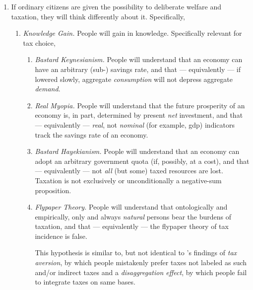 \begin{enumerate}
    \item \label{itm:think-different}
	If ordinary citizens are given the possibility to deliberate welfare and taxation, they will think differently about it.
	Specifically,

	\begin{enumerate}
		\item \label{itm:knowledge-gain} \emph{Knowledge Gain.}
		People will gain in knowledge.
		Specifically relevant for tax choice,

		\begin{enumerate}
			\item \label{itm:bastard-keynesianism} \emph{Bastard Keynesianism.}
			People will understand that an economy can have an arbitrary (sub-\citeauthor{Solow1956}) savings rate, and that --- equivalently --- if lowered slowly, aggregate \emph{consumption} will not depress aggregate \emph{demand}.

			\item \label{itm:real-myopia} \emph{Real Myopia.}
			People will understand that the future prosperity of an economy is, in part, determined by present \emph{net} investment, and that --- equivalently --- \emph{real}, not \emph{nominal} (for example, \gls{gdp}) indicators track the savings rate of an economy.

			\item \label{itm:bastard-hayekianism} \emph{Bastard Hayekianism.}
			People will understand that an economy can adopt an arbitrary government quota (if, possibly, at a cost), and that --- equivalently --- not \emph{all} (but some) taxed resources are lost.
			Taxation is not exclusively or unconditionally a negative-sum proposition.

			\item \label{itm:flyper-theory} \emph{Flypaper Theory.}
			People will understand that ontologically and empirically, only and always \emph{natural} persons bear the burdens of taxation, and that --- equivalently --- the flypaper theory of tax incidence is false.

			This hypothesis is similar to, but not identical to \citeauthor{McCafferyBaron2003}'s findings of \emph{tax aversion}, by which people mistakenly prefer taxes not labeled as such and/or indirect taxes and a \emph{disaggregation effect}, by which people fail to integrate taxes on same bases.


\end{enumerate}
\end{enumerate}
\end{enumerate}
